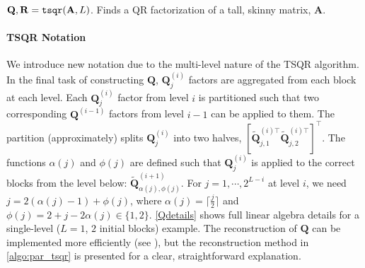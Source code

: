 \documentclass[review,onefignum,onetabnum]{siamart190516}
\newcommand{\bb}[1]{\mathbf{#1}}
\begin{document}
\begin{algorithm2e}[H]
{\begin{bmatrix}
		\end{bmatrix}\)
		}
	\Return{$\bb{Q}$, $\bb{R}$}
	\caption{$\bb{Q},\bb{R}={\tt tsqr}(\bb{A}, L)$.  Finds a QR factorization of a tall, skinny matrix, $\bb{A}$. }
	\label{algo:par_tsqr}
\end{algorithm2e}
\paragraph{TSQR Notation}
We introduce new notation due to the multi-level nature of the TSQR algorithm.
In the final task of constructing $\bb{Q}$, $\bb{Q}_j^{(i)}$ factors are aggregated from each block at each level.
Each $\bb{Q}_j^{(i)}$ factor from level $i$ is partitioned such that two corresponding $\bb{Q}^{(i-1)}$ factors from level $i-1$ can be applied to them. 
The partition (approximately) splits $\bb{Q}_{j}^{(i)}$ into two halves, $[\tilde{\bb{Q}}_{j, 1}^{(i)\top} \tilde{\bb{Q}}_{j, 2}^{(i)\top}]^{\top}$.
The functions $\alpha(j)$ and $\phi(j)$ are defined such that $\bb{Q}_j^{(i)}$ is applied to the correct blocks from the level below: $\tilde{\bb{Q}}_{\alpha(j), \phi(j)}^{(i+1)}$.
For $j = 1 , \cdots, 2^{L-i}$ at level $i$, we need $j = 2(\alpha(j)-1) + \phi(j)$, where $\alpha(j) = \lceil \frac{j}{2}\rceil$ and $\phi(j) = 2 + j - 2\alpha(j) \in\{1,2\}$.
\cref{Qdetails} shows full linear algebra details for a single-level ($L=1$, $2$ initial blocks) example.
The reconstruction of $\bb{Q}$ can be implemented more efficiently (see \cite{BDGJNS2014}), but the reconstruction method in \cref{algo:par_tsqr} is presented for a clear, straightforward explanation.
\end{document}
